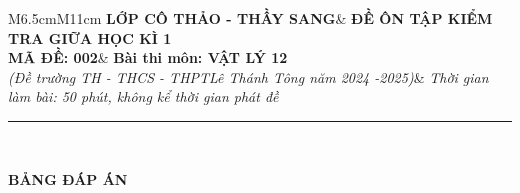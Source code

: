\begin{tabular}{M{6.5cm}M{11cm}}
	\textbf{LỚP CÔ THẢO - THẦY SANG}& \textbf{ĐỀ ÔN TẬP KIỂM TRA GIỮA HỌC KÌ 1}\\
	\textbf{MÃ ĐỀ: 002}& \textbf{Bài thi môn: VẬT LÝ 12}\\
	\textit{(Đề trường TH - THCS - THPT\newline Lê Thánh Tông năm 2024 -2025)}& \textit{Thời gian làm bài: 50 phút, không kể thời gian phát đề}
	
	\noindent\rule{4cm}{0.8pt} \\
\end{tabular}
\setcounter{section}{0}
\begin{center}
	\textbf{\large BẢNG ĐÁP ÁN}
\end{center}
\section{}
\section{}
\section{}
